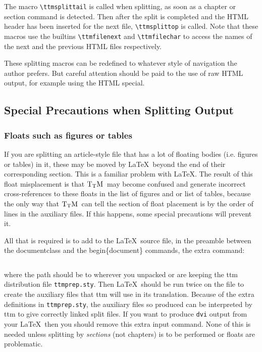 \documentclass[12pt]{article}
\def\TtM{$\rm{}T_TH$}
\def\TtM{$\rm{}T_TM$}%
\begin{document}
The macro \verb!\ttmsplittail! is called when splitting, as soon as a
chapter or section command is detected. Then after the split is
completed and the HTML header has been inserted for the next file,
\verb!\ttmsplittop! is called. Note that these macros use the
builtins \verb!\ttmfilenext! and \verb!\ttmfilechar! to access the
names of the next and the previous HTML files respectively.

These splitting macros can be redefined to whatever style of
navigation the author prefers. But careful attention should be paid to
the use of raw HTML output, for example using the HTML special.


\subsection{Special Precautions when Splitting Output}

\subsubsection{Floats such as figures or tables}
If you are splitting an article-style file that has a lot of
floating bodies (i.e. figures or tables) in it, these may be moved by
\LaTeX\ beyond the end of their corresponding section. This is a
familiar problem with \LaTeX. The result of this float misplacement
is that \TtM\ may become confused and generate incorrect
cross-references to these floats in the list of figures and or list of
tables, because the only way that \TtM\ can tell the section of float
placement is by the order of lines in the auxiliary files. If this
happens, some special precautions will prevent it. 

All that is required is to add to the \LaTeX\ source file, in the
preamble between the documentclass and the begin\{document\} commands,
the extra command:

\begin{verbatim}

\end{verbatim}

\noindent where the path should be to wherever you unpacked or are
keeping the ttm distribution file \verb!ttmprep.sty!. Then \LaTeX\ should
be run twice on the file to create the auxiliary files that ttm will
use in its translation. Because of the extra definitions in
\verb!ttmprep.sty!, the auxiliary files so produced can be interpreted by
ttm to give correctly linked split files. If you want to produce
\verb!dvi! output from your \LaTeX\ then you should remove this extra
input command.  None of this is needed unless splitting by {\em
sections\/} (not chapters) is to be performed or floats are
problematic.
\end{document}
